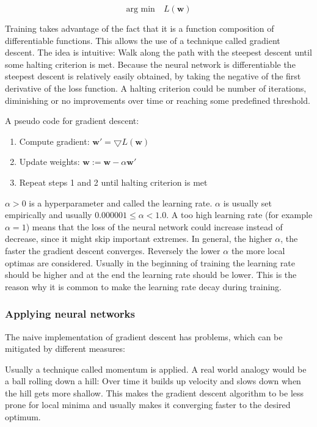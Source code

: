 \documentclass[draft,final,oneside]{vutinfth} %
\begin{document}
\begin{equation}
\text{arg min}\quad L(\boldsymbol{w})
\end{equation}

Training takes advantage of the fact that it is a function composition of differentiable functions. This allows the use of a technique called gradient descent. The idea is intuitive: Walk along the path with the steepest descent until some halting criterion is met. Because the neural network is differentiable the steepest descent is relatively easily obtained, by taking the negative of the first derivative of the loss function. A halting criterion could be number of iterations, diminishing or no improvements over time or reaching some predefined threshold.

A pseudo code for gradient descent:

\begin{enumerate}
\item Compute gradient: $\boldsymbol{w}' = \bigtriangledown	L(\boldsymbol{w})$
\item Update weights: $\boldsymbol{w} := \boldsymbol{w} - \alpha \boldsymbol{w}'$
\item Repeat steps 1 and 2 until halting criterion is met

\end{enumerate}

$\alpha > 0$ is a hyperparameter and called the learning rate. $\alpha$ is usually set empirically and usually $0.000001 \leq \alpha < 1.0$. A too high learning rate (for example $\alpha = 1$) means that the loss of the neural network could increase instead of decrease, since it might skip important extremes. In general, the higher $\alpha$, the faster the gradient descent converges. Reversely the lower $\alpha$ the more local optimas are considered. Usually in the beginning of training the learning rate should be higher and at the end the learning rate should be lower. This is the reason why it is common to make the learning rate decay during training.


\subsubsection{Applying neural networks}
The naive implementation of gradient descent has problems, which can be mitigated by different measures:

Usually a technique called momentum is applied. A real world analogy would be a ball rolling down a hill: Over time it builds up velocity and slows down when the hill gets more shallow. This makes the gradient descent algorithm to be less prone for local minima and usually makes it converging faster to the desired optimum.
\end{document}

